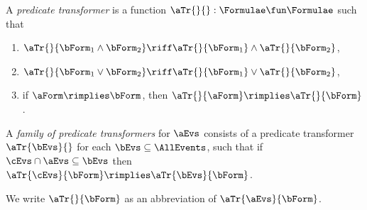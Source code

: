 \begin{definition}
  \label{def:trans}
  A \emph{predicate transformer} is a %
  function
  $\aTr{}{}:\Formulae\fun\Formulae$ such that
  \begin{multicols}{2}
    \begin{enumerate}[,label=(\textsc{x}\arabic*),ref=\textsc{x}\arabic*]
    \item \label{tr-and}
      $\aTr{}{\bForm_1\land\bForm_2}\riff\aTr{}{\bForm_1}\land\aTr{}{\bForm_2}$,    
    \item \label{tr-or}
      $\aTr{}{\bForm_1\lor\bForm_2}\riff\aTr{}{\bForm_1}\lor\aTr{}{\bForm_2}$, 
    \item \label{tr-implies}
      if $\aForm \rimplies \bForm$, then $\aTr{}{\aForm} \rimplies
      \aTr{}{\bForm}$.
    \end{enumerate}
  \end{multicols}
\end{definition}

\begin{definition}
  \label{def:family}
  A \emph{family of predicate transformers} for $\aEvs$ consists of a
  predicate transformer $\aTr{\bEvs}{}$ for each $\bEvs\subseteq\AllEvents$,
  such that if $\cEvs \cap \aEvs \subseteq \bEvs$ then
  $\aTr{\cEvs}{\bForm} \rimplies \aTr{\bEvs}{\bForm}$.

  We write $\aTr{}{\bForm}$ as an abbreviation of $\aTr{\aEvs}{\bForm}$.
\end{definition}

